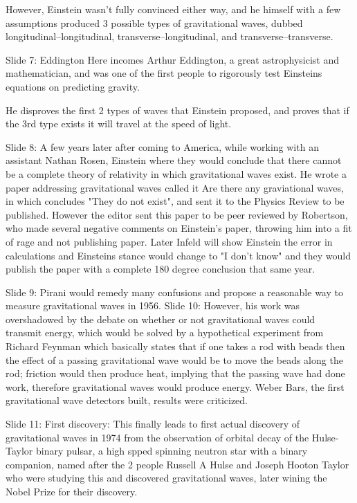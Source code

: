         However, Einstein wasn't fully convinced either way, and he himself with a few assumptions produced 3 possible types of gravitational waves, dubbed longitudinal–longitudinal, transverse–longitudinal, and transverse–transverse.
    
    Slide 7: Eddington
        Here incomes Arthur Eddington, a great astrophysicist and mathematician, and was one of the first people to rigorously test Einsteins equations on predicting gravity.   
    
        He disproves the first 2 types of waves that Einstein proposed, and proves that if the 3rd type exists it will travel at the speed of light.
    
    Slide 8: 
        A few years later after coming to America, while working with an assistant Nathan Rosen, Einstein where they would conclude that there cannot be a complete theory of relativity in which gravitational waves exist. 
        He wrote a paper addressing gravitational waves called it Are there any graviational waves, in which concludes "They do not exist", and sent it to the Physics Review to be published. However the editor sent this paper to be peer reviewed by Robertson, who made several negative comments on Einstein's paper, throwing him into a fit of rage and not publishing paper. 
        Later Infeld will show Einstein the error in calculations and Einsteins stance would change to "I don't know" and they would publish the paper with a complete 180 degree conclusion that same year. 
    
    Slide 9:
        Pirani would remedy many confusions and propose a reasonable way to measure gravitational waves in 1956. 
    Slide 10:
        However, his work was overshadowed by the debate on whether or not gravitational waves could transmit energy, which would be solved by a hypothetical experiment from Richard Feynman which basically states that if one takes a rod with beads then the effect of a passing gravitational wave would be to move the beads along the rod; friction would then produce heat, implying that the passing wave had done work, therefore gravitational waves would produce energy.
        Weber Bars, the first gravitational wave detectors built, results were criticized.    
    
    Slide 11:
        First discovery:
        This finally leads to first actual discovery of gravitational waves in 1974 from the observation of orbital decay of the Hulse-Taylor binary pulsar, a high spped spinning neutron star with a binary companion, named after the 2 people Russell A Hulse and Joseph Hooton Taylor who were studying this and discovered gravitational waves, later wining the Nobel Prize for their discovery.
    
